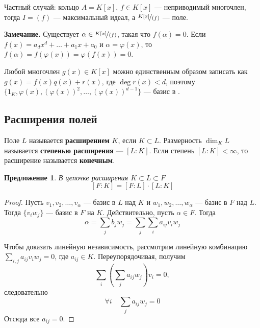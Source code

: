 \documentclass[a4paper]{article}
\let\temp\phi
\let\phi\varphi
\let\varphi\temp
\numberwithin{theorem}{section}
\numberwithin{lemma}{section}
\newtheorem{proposition}{Предложение}
\numberwithin{proposition}{section}
\numberwithin{corollary}{section}
\begin{document}
\begin{minipage}{0.7\linewidth}
Частный случай: кольцо $A = K[x]$, $f \in K[x]$ --- неприводимый многочлен, тогда $I = (f)$ --- максимальный идеал,
а $\nicefrac{K[x]}{(f)}$ --- поле.
\end{minipage}
\begin{minipage}{0.15\linewidth}
\end{minipage}


\textbf{Замечание.}
Существует $\alpha \in \nicefrac{K[x]}{(f)}$, такая что $f(\alpha) = 0$. Если $f(x) = a_d x^d + \ldots + a_1 x + a_0 $ и $\alpha = \phi(x)$,
то $f(\alpha) = f(\phi(x)) = \phi(f(x)) = 0$.

Любой многочлен $g(x) \in K[x]$ можно единственным образом записать как $g(x) = f(x)q(x) + r(x)$, где $\deg r(x) < d$, поэтому
$\{1_K, \phi(x), (\phi(x))^2, \ldots, (\phi(x))^{d-1}\}$ --- базис в
.

\subsection*{Расширения полей}
Поле $L$ называется \textbf{расширением} $K$, если $K \subset L$.
Размерность $\dim_K L$ называется \textbf{степенью расширения} --- $[L : K]$.
Если степень $[L : K] < \infty$, то расширение называется \textbf{конечным}.

\begin{proposition} В цепочке расширения $K \subset L \subset F$
\[[F:K] = [F:L] \cdot [L : K]\]
\end{proposition}
\begin{proof}
Пусть $v_1, v_2, \ldots, v_\alpha$ --- базис в $L$ над $K$ и
$w_1, w_2, \ldots, w_\alpha$ --- базис в $F$ над $L$.
Тогда $\{v_i w_j\}$ --- базис в $F$ на $K$.
Действительно, пусть $\alpha \in F$. Тогда
\[\alpha = \sum_j b_j w_j = \sum_j \sum_i a_{ij}v_i w_j \]

Чтобы доказать линейную независимость, рассмотрим
линейную комбинацию $\sum_{i,j} a_{ij}v_i w_j = 0$, где $a_{ij} \in K$.
Переупорядочивая, получим \[\sum_i\left(\sum_j a_{ij} w_j\right)v_i = 0,\]
следовательно \[\forall i \quad \sum_j a_{ij} w_j = 0\]
Отсюда все $a_{ij} = 0$.
\end{proof}
\end{document}
